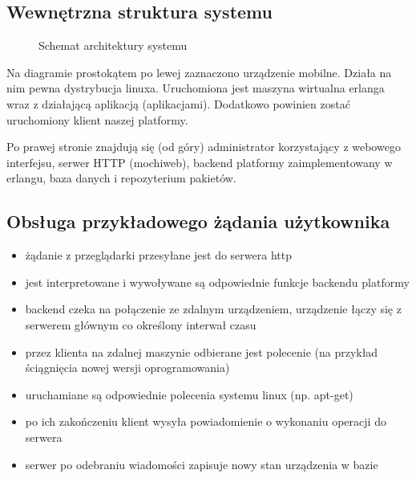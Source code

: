 \documentclass[polish,12pt]{aghthesis}
\begin{document}
\subsection{Wewnętrzna struktura systemu}
  \begin{figure}
    \centering
        \caption{Schemat architektury systemu}
  \end{figure}

Na diagramie prostokątem po lewej zaznaczono urządzenie mobilne. Działa na nim pewna dystrybucja linuxa. Uruchomiona jest maszyna wirtualna erlanga wraz z działającą aplikacją (aplikacjami). Dodatkowo powinien zostać uruchomiony klient naszej platformy.

Po prawej stronie znajdują się (od góry) administrator korzystający z webowego interfejsu, serwer HTTP (mochiweb), backend platformy zaimplementowany w erlangu, baza danych i repozyterium pakietów.

\subsection{Obsługa przykładowego żądania użytkownika}
\begin{itemize}
\item żądanie z przeglądarki przesyłane jest do serwera http
\item jest interpretowane i wywoływane są odpowiednie funkcje backendu platformy
\item backend czeka na połączenie ze zdalnym urządzeniem, urządzenie łączy się z serwerem głównym co określony interwał czasu
\item przez klienta na zdalnej maszynie odbierane jest polecenie (na przykład ściągnięcia nowej wersji oprogramowania)
\item uruchamiane są odpowiednie polecenia systemu linux (np. apt-get)
\item po ich zakończeniu klient wysyła powiadomienie o wykonaniu operacji do serwera
\item serwer po odebraniu wiadomości zapisuje nowy stan urządzenia w bazie
\end{itemize}
\end{document}
